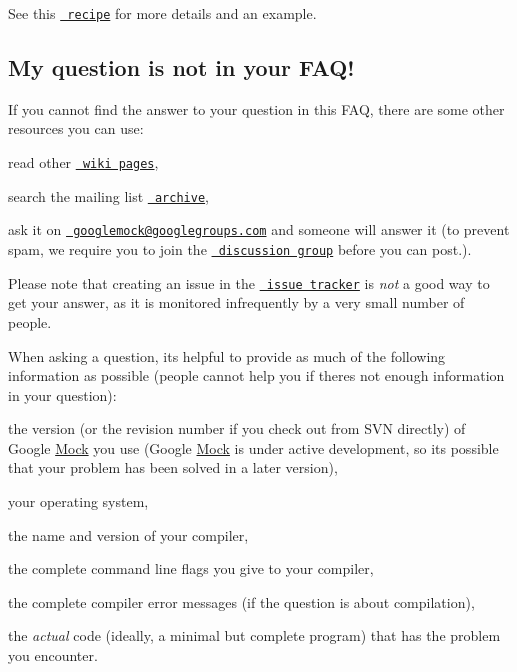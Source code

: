 See this \href{http://code.google.com/p/googlemock/wiki/V1_6_CookBook#Mocking_Side_Effects}\texttt{ recipe} for more details and an example.

\subsection*{My question is not in your F\+A\+Q!}

If you cannot find the answer to your question in this F\+AQ, there are some other resources you can use\+:


\begin{DoxyEnumerate}
\item read other \href{http://code.google.com/p/googlemock/w/list}\texttt{ wiki pages},
\end{DoxyEnumerate}
\begin{DoxyEnumerate}
\item search the mailing list \href{http://groups.google.com/group/googlemock/topics}\texttt{ archive},
\end{DoxyEnumerate}
\begin{DoxyEnumerate}
\item ask it on \href{mailto:googlemock@googlegroups.com}\texttt{ googlemock@googlegroups.\+com} and someone will answer it (to prevent spam, we require you to join the \href{http://groups.google.com/group/googlemock}\texttt{ discussion group} before you can post.).
\end{DoxyEnumerate}

Please note that creating an issue in the \href{http://code.google.com/p/googlemock/issues/list}\texttt{ issue tracker} is {\itshape not} a good way to get your answer, as it is monitored infrequently by a very small number of people.

When asking a question, it\textquotesingle{}s helpful to provide as much of the following information as possible (people cannot help you if there\textquotesingle{}s not enough information in your question)\+:


\begin{DoxyItemize}
\item the version (or the revision number if you check out from S\+VN directly) of Google \mbox{\hyperlink{class_mock}{Mock}} you use (Google \mbox{\hyperlink{class_mock}{Mock}} is under active development, so it\textquotesingle{}s possible that your problem has been solved in a later version),
\item your operating system,
\item the name and version of your compiler,
\item the complete command line flags you give to your compiler,
\item the complete compiler error messages (if the question is about compilation),
\item the {\itshape actual} code (ideally, a minimal but complete program) that has the problem you encounter. 
\end{DoxyItemize}